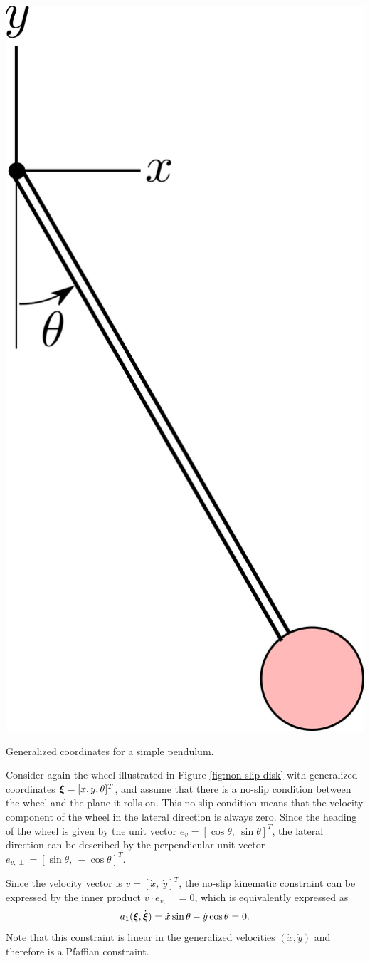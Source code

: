 \begin{marginfigure}
    \centering 
    \includegraphics[width=0.55\linewidth]{figs/ch01_figs/pendulum.png}
    \caption{Generalized coordinates for a simple pendulum. } 
    \label{fig:pendulum} 
\end{marginfigure} 



\begin{example} \label{ex:noslipwheel}
\theoremstyle{definition}
Consider again the wheel illustrated in Figure \ref{fig:non slip disk} with generalized coordinates $\bm{\xi} = [x, y, \theta]^T$, and assume that there is a no-slip condition between the wheel and the plane it rolls on. This no-slip condition means that the velocity component of the wheel in the lateral direction is always zero. Since the heading of the wheel is given by the unit vector $e_v = [\cos\theta, \:\sin\theta]^T$, the lateral direction can be described by the perpendicular unit vector $e_{v,\perp} = [\sin\theta, \: -\cos\theta]^T$. 

Since the velocity vector is $v = [\dot{x}, \: \dot{y}]^T$, the no-slip kinematic constraint can be expressed by the inner product $v \cdot e_{v,\perp} = 0$, which is equivalently expressed as
\begin{equation} \label{eq:wheelnonholonomic}
a_1(\bm{\xi},\dot{\bm{\xi}}) = \dot{x} \sin\theta - \dot{y} \cos \theta = 0.
\end{equation}
Note that this constraint is linear in the generalized velocities $(\dot{x}, \dot{y})$ and therefore is a Pfaffian constraint.
\end{example}


